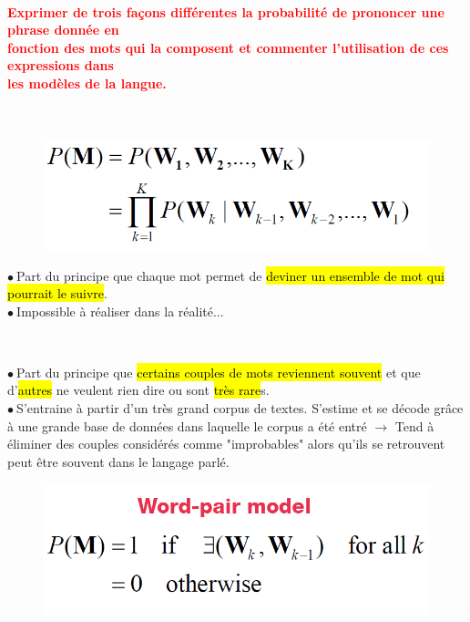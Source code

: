 \documentclass[letterpaper, 12pt]{article}
\newcommand{\red}[1]{
	\textcolor{red}{#1}
}
\newcommand{\point}{$\bullet\ $}
\begin{document}
		\paragraph{\red{Exprimer de trois façons différentes la probabilité de prononcer une phrase donnée en 
		~\\ \hspace*{0.035cm} fonction des mots qui la composent et commenter l'utilisation de ces expressions dans 
		~\\ \hspace*{0.035cm} les modèles de la langue.}}~\\
		\begin{minipage}{0.4\textwidth}
			\begin{figure}[H]
				\includegraphics[scale=0.4]{Images/language_model1}
			\end{figure}\noindent
		\end{minipage}\hfill
		\begin{minipage}{0.55\textwidth}
			\point Part du principe que chaque mot permet de \hl{deviner un ensemble de mot qui pourrait le suivre}.\\
			\point Impossible à réaliser dans la réalité...
		\end{minipage}~\\
		\begin{minipage}{0.55\textwidth}
			\point Part du principe que \hl{certains couples de mots reviennent souvent} et que d'\hl{autres} 
				ne veulent rien dire ou sont \hl{tr\`es rare}s.\\
			\point S'entraine à partir d'un très grand corpus de textes. S'estime et se décode grâce
				à une grande base de données dans laquelle le corpus a été entré $\rightarrow$ Tend à
				éliminer des couples considérés comme "improbables" alors qu'ils se retrouvent peut être souvent
				dans le langage parlé.
		\end{minipage}\hfill
		\begin{minipage}{0.4\textwidth}
			\begin{figure}[H]
				\centering
				\includegraphics[scale=0.4]{Images/language_model2}
			\end{figure}\noindent
		\end{minipage}~\\
\end{document}
